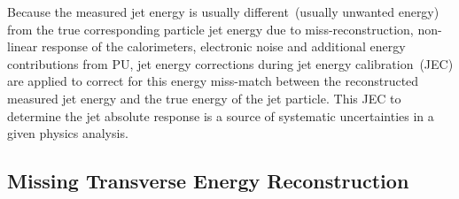 Because the measured jet energy is usually different~(usually unwanted energy) from the true corresponding particle jet energy due to miss-reconstruction, non-linear response of the calorimeters, electronic noise and additional energy contributions from PU, jet energy corrections during jet energy calibration~(JEC) are applied to correct for this energy miss-match between the reconstructed measured jet energy and the true energy of the jet particle. This JEC to determine the jet absolute response is a source of systematic uncertainties in a given physics analysis.
\subsection{Missing Transverse Energy Reconstruction}

